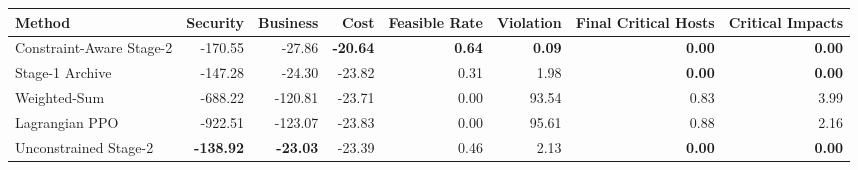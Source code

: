 \begin{tabular}{@{}lrrrrrrr@{}}
\toprule
Method & Security & Business & Cost & Feasible Rate & Violation & Final Critical Hosts & Critical Impacts \\
\midrule
Constraint-Aware Stage-2 & -170.55 & -27.86 & \textbf{-20.64} & \textbf{0.64} & \textbf{0.09} & \textbf{0.00} & \textbf{0.00} \\
Stage-1 Archive & -147.28 & -24.30 & -23.82 & 0.31 & 1.98 & \textbf{0.00} & \textbf{0.00} \\
Weighted-Sum & -688.22 & -120.81 & -23.71 & 0.00 & 93.54 & 0.83 & 3.99 \\
Lagrangian PPO & -922.51 & -123.07 & -23.83 & 0.00 & 95.61 & 0.88 & 2.16 \\
Unconstrained Stage-2 & \textbf{-138.92} & \textbf{-23.03} & -23.39 & 0.46 & 2.13 & \textbf{0.00} & \textbf{0.00} \\
\bottomrule
\end{tabular}
